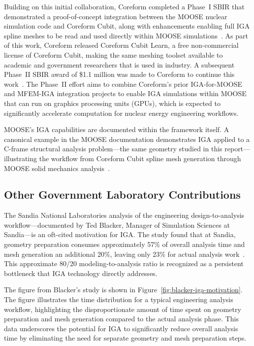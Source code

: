 \documentclass[12pt,report,justified]{SANDreport}
\begin{document}
Building on this initial collaboration, Coreform completed a Phase~I SBIR that demonstrated a proof-of-concept integration between the MOOSE nuclear simulation code and Coreform Cubit, along with enhancements enabling full IGA spline meshes to be read and used directly within MOOSE simulations~\cite{CoreformPhaseIISBIR2025}.  As part of this work, Coreform released Coreform Cubit Learn, a free non-commercial license of Coreform Cubit, making the same meshing toolset available to academic and government researchers that is used in industry.  A subsequent Phase~II SBIR award of \$1.1 million was made to Coreform to continue this work~\cite{CoreformPhaseIISBIR2025}.  The Phase~II effort aims to combine Coreform's prior IGA-for-MOOSE and MFEM-IGA integration projects to enable IGA simulations within MOOSE that can run on graphics processing units (GPUs), which is expected to significantly accelerate computation for nuclear energy engineering workflows.

MOOSE's IGA capabilities are documented within the framework itself.  A canonical example in the MOOSE documentation demonstrates IGA applied to a C-frame structural analysis problem---the same geometry studied in this report---illustrating the workflow from Coreform Cubit spline mesh generation through MOOSE solid mechanics analysis~\cite{MOOSEIGAExample}.

\subsection{Other Government Laboratory Contributions}

The Sandia National Laboratories analysis of the engineering design-to-analysis workflow---documented by Ted Blacker, Manager of Simulation Sciences at Sandia---is an oft-cited motivation for IGA.  The study found that at Sandia, geometry preparation consumes approximately 57\% of overall analysis time and mesh generation an additional 20\%, leaving only 23\% for actual analysis work~\cite{Scott2011TSplines}.  This approximate 80/20 modeling-to-analysis ratio is recognized as a persistent bottleneck that IGA technology directly addresses.

The figure from Blacker's study is shown in Figure~\ref{fig:blacker-iga-motivation}.  The figure illustrates the time distribution for a typical engineering analysis workflow, highlighting the disproportionate amount of time spent on geometry preparation and mesh generation compared to the actual analysis phase.  This data underscores the potential for IGA to significantly reduce overall analysis time by eliminating the need for separate geometry and mesh preparation steps.
\end{document}
